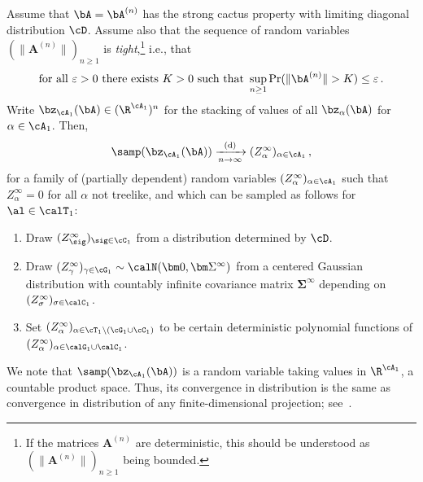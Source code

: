 \begin{theorem}
\label{prop:convergence-distribution}
    Assume that $\bA = \bA^{(n)}$ has the strong cactus property with limiting diagonal distribution $\cD$. 
    Assume also that the sequence of random variables 
    $(\|\bm A^{(n)}\|)_{n\ge 1}$ is \emph{tight},\footnote{If the matrices $\bm A^{(n)}$ are deterministic, this should be understood as $(\|\bm A^{(n)}\|)_{n\ge 1}$ being bounded.} i.e., that
    \begin{equation}
        \text{for all } \varepsilon > 0 \text{ there exists } K > 0 \text{ such that } \sup_{n\ge 1}\Pr(\|\bA^{(n)}\|>K)\le \varepsilon\,.\label{eq:tightnessNorm}
    \end{equation}
    Write $\bz_{\cA_1}(\bA) \in (\R^{\cA_1})^n$ for the stacking of values of all $\bz_{\alpha}(\bA)$ for $\alpha \in \cA_1$.
    Then,
    \[ \samp(\bz_{\cA_1}(\bA)) \xrightarrow[n \to \infty] {\textnormal{(d)}} (Z_{\alpha}^{\infty})_{\alpha \in \cA_1}\,, \]
    for a family of (partially dependent) random variables $(Z_{\alpha}^{\infty})_{\alpha \in \cA_1}$ such that $Z_{\alpha}^{\infty} = 0$ for all $\alpha$ not treelike, and which can be sampled as follows for $\al \in \calT_1$:
    \begin{enumerate}
        \item Draw $(Z_{\sig}^{\infty})_{\sig \in \cC_1}$ from a distribution determined by $\cD$.
        \item Draw $(Z_{\gamma}^{\infty})_{\gamma \in \cG_1} \sim \calN(\bm 0, \bm\Sigma^\infty)$ from a centered Gaussian distribution with countably infinite covariance matrix $\bm\Sigma^\infty$ depending on $(Z_{\sigma}^{\infty})_{\sigma\in\calC_1}$.
        \item Set $(Z_{\alpha}^{\infty})_{\alpha \in \cT_1  \setminus (\cG_1 \cup \cC_1)}$ to be certain deterministic polynomial functions of $(Z_{\alpha}^{\infty})_{\alpha\in \calG_1\cup \calC_1}$.
    \end{enumerate}
\end{theorem}
\noindent
We note that $\samp(\bz_{\cA_1}(\bA))$ is a random variable taking values in $\R^{\cA_1}$, a countable product space.
Thus, its convergence in distribution is the same as convergence in distribution of any finite-dimensional projection; see~.

